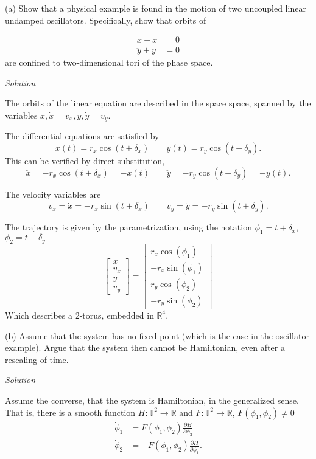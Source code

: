 \documentclass[a4paper,11pt,pdftex]{article}
\newcommand{\R}{\mathbb{R}}
\newcommand{\T}{\mathbb{T}}
\begin{document}
(a) Show that a physical example is found in the motion of two uncoupled linear undamped oscillators. Specifically, show that orbits of

\begin{align*}
    \ddot{x} + x &= 0 \\
    \ddot{y} + y &= 0 
\end{align*}
are confined to two-dimensional tori of the phase space. 

\emph{Solution}

The orbits of the linear equation are described in the space space, spanned by the variables $x, \dot{x}=v_x, y, \dot{y}=v_y$. 

The differential equations are satisfied by
$$
x(t) = r_x \cos(t + \delta_x) \qquad y(t) = r_y\cos (t+\delta_y).
$$
This can be verified by direct substitution,
$$
\ddot{x} = -r_x \cos(t+\delta_x)=-x(t) \qquad \ddot{y} = -r_y \cos(t+\delta_y)=-y(t).
$$

The velocity variables are 
$$
v_x=\dot{x} = -r_x\sin(t+\delta_x) \qquad v_y=\dot{y} = -r_y\sin(t+\delta_y).
$$

The trajectory is given by the parametrization, using the notation $\phi_1 = t+\delta_x$, $\phi_2 = t+\delta_y$
$$
\begin{bmatrix} x \\ v_x \\ y \\ v_y \end{bmatrix} = \begin{bmatrix} r_x \cos(\phi_1) \\ -r_x \sin(\phi_1)\\ r_y\cos(\phi_2) \\ -r_y\sin(\phi_2) \end{bmatrix}
$$
Which describes a 2-torus, embedded in $\R^4$. 

(b) Assume that the system has no fixed point (which is the case in the oscillator example). Argue that the system then cannot be Hamiltonian, even after a rescaling of time. 

\emph{Solution}

Assume the converse, that the system is Hamiltonian, in the generalized sense. That is, there is a smooth function $H:\T^2 \to \R$ and $F : \T^2 \to \R$, $F(\phi_1, \phi_2) \neq 0$
\begin{align}
    \dot{\phi}_1 &= F(\phi_1, \phi_2) \frac{\partial H}{\partial \phi_2}\\
    \dot{\phi}_2 &= -F(\phi_1, \phi_2)\frac{\partial H}{\partial \phi_1}.
\end{align}
\end{document}
